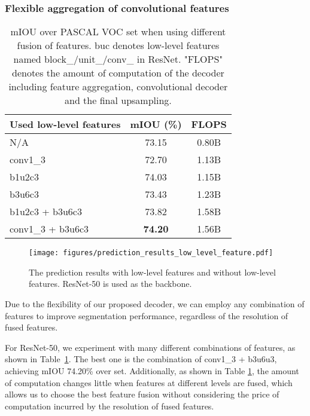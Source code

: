 \documentclass[10pt,twocolumn,letterpaper]{article}
\newcommand{\1}{{\mathbbm{1}}}
\begin{document}
\subsubsection{Flexible aggregation of convolutional features}



\begin{table}
\begin{center}
\small
\begin{tabular}{l|c|c}
\hline
Used low-level features & mIOU (\%) & FLOPS\\
\hline\hline
N/A & 73.15 & 0.80B \\
conv1\_3 & 72.70 & 1.13B \\
b1u2c3 & 74.03 & 1.15B \\
b3u6c3 & 73.43 & 1.23B \\
b1u2c3 + b3u6c3 & 73.82 & 1.58B \\
conv1\_3 + b3u6c3 & \textbf{74.20} & 1.56B \\
\hline
\end{tabular}
\end{center}
\vspace{-0.5cm}
\caption{mIOU over PASCAL VOC  set when using different fusion of features. buc denotes low-level features named block\_/unit\_/conv\_ in ResNet. "FLOPS" denotes the amount of computation of the decoder including feature aggregation, convolutional decoder and the final upsampling.}
\label{table:combination_of_features}
\vspace{-0.7cm}
\end{table}

\begin{figure}[!b]
  \centering
  \texttt{[image: figures/prediction\_results\_low\_level\_feature.pdf]}
  \caption{The prediction results with low-level features and without low-level features. ResNet-50 is used as the backbone.}
  \label{fig:prediction_results}
\end{figure}

Due  to the flexibility of our proposed decoder, we can employ any combination of features to improve segmentation performance, regardless of the resolution of fused features.

For ResNet-50, we experiment with many different combinations of features, as shown in Table~\ref{table:combination_of_features}. The best one is the combination of conv1\_3 + b3u6u3, achieving mIOU 74.20\% over  set. Additionally, as shown in Table \ref{table:combination_of_features}, the amount of computation changes little when features at different levels are fused, which allows us to choose the best feature fusion without considering the price of computation incurred by the resolution of fused features.
\end{document}
